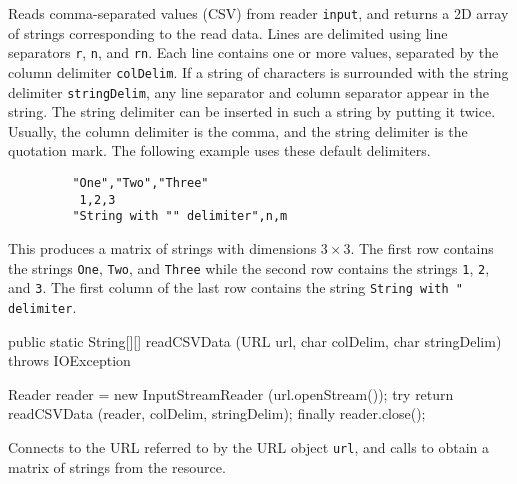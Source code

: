 \begin{tabb}   Reads comma-separated values (CSV) from reader \texttt{input}, and
  returns a 2D array of strings corresponding to the read data.
  Lines are delimited using line separators \texttt{\bs r},
  \texttt{\bs n}, and \texttt{\bs r\bs n}.
  Each line contains one or more values, separated by the column
  delimiter \texttt{colDelim}.
  If a string of characters is surrounded with the string delimiter
  \texttt{stringDelim}, any line separator and column separator appear in
  the string.  The string delimiter can be inserted in such a string by
  putting it twice.
  Usually, the column delimiter is the comma, and the string delimiter is
  the quotation mark. The following example uses these default
  delimiters.
\begin{verbatim}
         "One","Two","Three"
          1,2,3
         "String with "" delimiter",n,m
\end{verbatim}
This produces a matrix of strings with dimensions $3\times 3$.
The first row contains the strings \texttt{One}, \texttt{Two}, and \texttt{Three}
while the second row contains the strings \texttt{1}, \texttt{2}, and \texttt{3}.
The first column of the last row contains the string
\texttt{String with " delimiter}.
\end{tabb}
\begin{htmlonly}
\end{htmlonly}
\begin{code}

   public static String[][] readCSVData (URL url, char colDelim,
                                         char stringDelim)
                                         throws IOException\begin{hide} {
      Reader reader = new InputStreamReader (url.openStream());
      try {
         return readCSVData (reader, colDelim, stringDelim);
      }
      finally {
         reader.close();
      }
   }\end{hide}
\end{code}
\begin{tabb}   Connects to the URL referred to by the URL object \texttt{url},
 and calls  to
 obtain a matrix of strings from
 the resource.
\end{tabb}
\begin{htmlonly}
\end{htmlonly}
